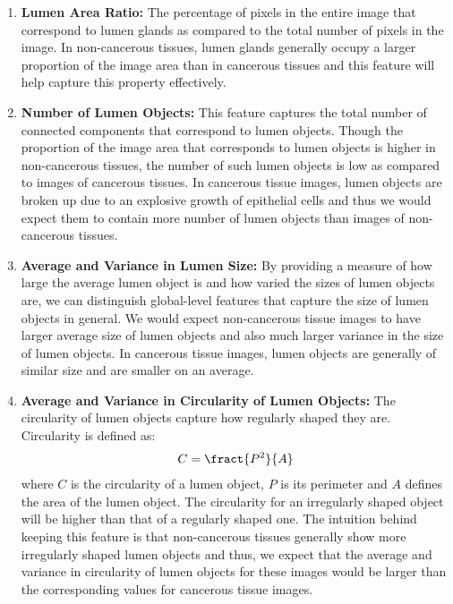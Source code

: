 \begin{enumerate}
\item \textbf{Lumen Area Ratio:} The percentage of pixels in the entire image that correspond to lumen glands as compared to the total number of pixels in the image. In non-cancerous tissues, lumen glands generally occupy a larger proportion of the image area than in cancerous tissues and this feature will help capture this property effectively.

\item \textbf{Number of Lumen Objects:} This feature captures the total number of connected components that correspond to lumen objects. Though the proportion of the image area that corresponds to lumen objects is higher in non-cancerous tissues, the number of such lumen objects is low as compared to images of cancerous tissues. In cancerous tissue images, lumen objects are broken up due to an explosive growth of epithelial cells and thus we would expect them to contain more number of lumen objects than images of non-cancerous tissues.

\item \textbf{Average and Variance in Lumen Size:} By providing a measure of how large the average lumen object is and how varied the sizes of lumen objects are, we can distinguish global-level features that capture the size of lumen objects in general. We would expect non-cancerous tissue images to have larger average size of lumen objects and also much larger variance in the size of lumen objects. In cancerous tissue images, lumen objects are generally of similar size and are smaller on an average.

\item \textbf{Average and Variance in Circularity of Lumen Objects:} The circularity of lumen objects capture how regularly shaped they are. Circularity is defined as:\\
\begin{align*}
C = \fract{P^2}{A}
\end{align*}
where $C$ is the circularity of a lumen object, $P$ is its perimeter and $A$ defines the area of the lumen object.
The circularity for an irregularly shaped object will be higher than that of a regularly shaped one.
The intuition behind keeping this feature is that non-cancerous tissues generally show more irregularly shaped lumen objects and thus, we expect that the average and variance in circularity of lumen objects for these images would be larger than the corresponding values for cancerous tissue images.


\end{enumerate}
